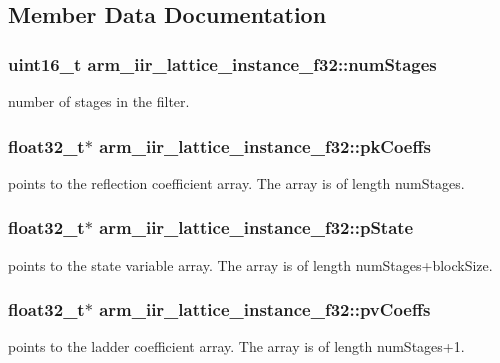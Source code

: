 \subsection{Member Data Documentation}
\hypertarget{structarm__iir__lattice__instance__f32_af8de449af5efe1f30be82f9ba35587ee}{
\subsubsection[{num\-Stages}]{\setlength{\rightskip}{0pt plus 5cm}uint16\-\_\-t arm\-\_\-iir\-\_\-lattice\-\_\-instance\-\_\-f32\-::num\-Stages}}\label{structarm__iir__lattice__instance__f32_af8de449af5efe1f30be82f9ba35587ee}
number of stages in the filter. \hypertarget{structarm__iir__lattice__instance__f32_aa69fcdd3775e828d450ce1bbd978fa31}{
\subsubsection[{pk\-Coeffs}]{\setlength{\rightskip}{0pt plus 5cm}float32\-\_\-t$\ast$ arm\-\_\-iir\-\_\-lattice\-\_\-instance\-\_\-f32\-::pk\-Coeffs}}\label{structarm__iir__lattice__instance__f32_aa69fcdd3775e828d450ce1bbd978fa31}
points to the reflection coefficient array. The array is of length num\-Stages. \hypertarget{structarm__iir__lattice__instance__f32_a30babe7815510219e6e3d28e6e4a5969}{
\subsubsection[{p\-State}]{\setlength{\rightskip}{0pt plus 5cm}float32\-\_\-t$\ast$ arm\-\_\-iir\-\_\-lattice\-\_\-instance\-\_\-f32\-::p\-State}}\label{structarm__iir__lattice__instance__f32_a30babe7815510219e6e3d28e6e4a5969}
points to the state variable array. The array is of length num\-Stages+block\-Size. \hypertarget{structarm__iir__lattice__instance__f32_afc7c8f577e6f27d097fe55f57e707f72}{
\subsubsection[{pv\-Coeffs}]{\setlength{\rightskip}{0pt plus 5cm}float32\-\_\-t$\ast$ arm\-\_\-iir\-\_\-lattice\-\_\-instance\-\_\-f32\-::pv\-Coeffs}}\label{structarm__iir__lattice__instance__f32_afc7c8f577e6f27d097fe55f57e707f72}
points to the ladder coefficient array. The array is of length num\-Stages+1. 

